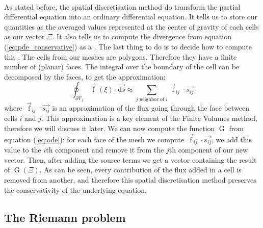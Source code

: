       \paragraph{}
      As stated before, the spatial discretisation method do transform the partial differential equation into an ordinary differential equation.
      It tells us to store our quantities as the averaged values represented at the center of gravity of each cells as our vector $\Xi$.
      It also tells us to compute the divergence from equation (\ref{eq:pde_conservative}) as a .
      The last thing to do is to decide how to compute this .
      The cells from our meshes are polygons.
      Therefore they have a finite number of (planar) faces.
      The integral over the boundary of the cell can be decomposed by the faces, to get the approximation:
      \begin{equation}
        \oint_{\partial\mathcal{V}_i} \vec{\operatorname{f}}\left(\xi\right) \cdot \vec{\mathrm{d}s} \approx \sum_{j\textrm{ neighbor of } i} \vec{\operatorname{f}}_{ij} \cdot \vec{s_{ij}}
      \end{equation}
      where $\vec{\operatorname{f}}_{ij} \cdot \vec{s_{ij}}$ is an approximation of the flux going through the face between cells $i$ and $j$.
      This approximation is a key element of the Finite Volumes method, therefore we will discuss it later.
      We can now compute the function $\operatorname{G}$ from equation (\ref{eq:ode}): for each face of the mesh we compute $\vec{\operatorname{f}}_{ij} \cdot \vec{s_{ij}}$, we add this value to the $i$th component and remove it from the $j$th component of our new vector.
      Then, after adding the source terms we get a vector containing the result of $\operatorname{G}\left(\Xi\right)$.
      As can be seen, every contribution of the flux added in a cell is removed from another, and therefore this spatial discretisation method preserves the conservativity of the underlying equation.


    \subsection{The Riemann problem}


